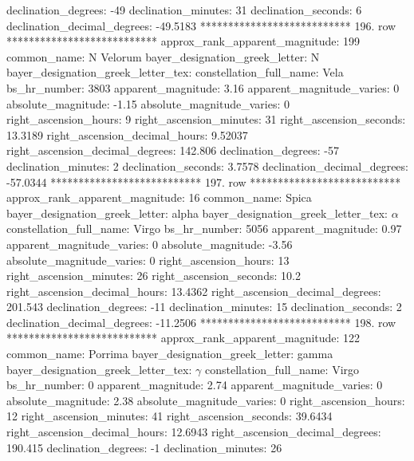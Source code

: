                declination_degrees: -49
               declination_minutes: 31
               declination_seconds: 6
       declination_decimal_degrees: -49.5183
*************************** 196. row ***************************
    approx_rank_apparent_magnitude: 199
                       common_name: N Velorum
    bayer_designation_greek_letter: N
bayer_designation_greek_letter_tex: 
           constellation_full_name: Vela
                      bs_hr_number: 3803
                apparent_magnitude: 3.16
         apparent_magnitude_varies: 0
                absolute_magnitude: -1.15
         absolute_magnitude_varies: 0
             right_ascension_hours: 9
           right_ascension_minutes: 31
           right_ascension_seconds: 13.3189
     right_ascension_decimal_hours: 9.52037
   right_ascension_decimal_degrees: 142.806
               declination_degrees: -57
               declination_minutes: 2
               declination_seconds: 3.7578
       declination_decimal_degrees: -57.0344
*************************** 197. row ***************************
    approx_rank_apparent_magnitude: 16
                       common_name: Spica
    bayer_designation_greek_letter: alpha
bayer_designation_greek_letter_tex: $\alpha$
           constellation_full_name: Virgo
                      bs_hr_number: 5056
                apparent_magnitude: 0.97
         apparent_magnitude_varies: 0
                absolute_magnitude: -3.56
         absolute_magnitude_varies: 0
             right_ascension_hours: 13
           right_ascension_minutes: 26
           right_ascension_seconds: 10.2
     right_ascension_decimal_hours: 13.4362
   right_ascension_decimal_degrees: 201.543
               declination_degrees: -11
               declination_minutes: 15
               declination_seconds: 2
       declination_decimal_degrees: -11.2506
*************************** 198. row ***************************
    approx_rank_apparent_magnitude: 122
                       common_name: Porrima
    bayer_designation_greek_letter: gamma
bayer_designation_greek_letter_tex: $\gamma$
           constellation_full_name: Virgo
                      bs_hr_number: 0
                apparent_magnitude: 2.74
         apparent_magnitude_varies: 0
                absolute_magnitude: 2.38
         absolute_magnitude_varies: 0
             right_ascension_hours: 12
           right_ascension_minutes: 41
           right_ascension_seconds: 39.6434
     right_ascension_decimal_hours: 12.6943
   right_ascension_decimal_degrees: 190.415
               declination_degrees: -1
               declination_minutes: 26
